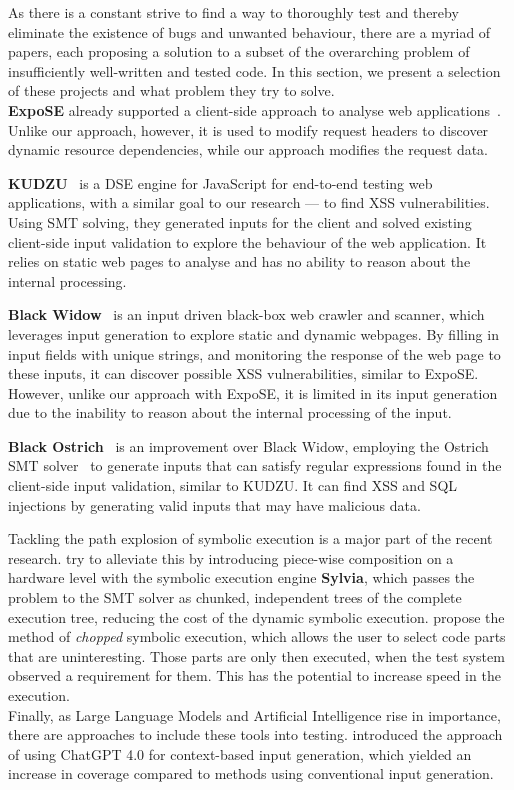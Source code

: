 As there is a constant strive to find a way to thoroughly test and thereby eliminate the existence of bugs and unwanted behaviour, there are a myriad of papers, each proposing a solution to a subset of the overarching problem of insufficiently well-written and tested code. In this section, we present a selection of these projects and what problem they try to solve.\\

\textbf{ExpoSE} already supported a client-side approach to analyse web applications~\cite{loring_practical_2021}. Unlike our approach, however, it is used to modify request headers to discover dynamic resource dependencies, while our approach modifies the request data.

\textbf{KUDZU}~\cite{saxena_symbolic_2010} is a DSE engine for JavaScript for end-to-end testing web applications, with a similar goal to our research — to find XSS vulnerabilities. Using SMT solving, they generated inputs for the client and solved existing client-side input validation to explore the behaviour of the web application. It relies on static web pages to analyse and has no ability to reason about the internal processing.

\textbf{Black Widow}~\cite{eriksson_black_2021} is an input driven black-box web crawler and scanner, which leverages input generation to explore static and dynamic webpages. By filling in input fields with unique strings, and monitoring the response of the web page to these inputs, it can discover possible XSS vulnerabilities, similar to ExpoSE. However, unlike our approach with ExpoSE, it is limited in its input generation due to the inability to reason about the internal processing of the input.  

\textbf{Black Ostrich}~\cite{eriksson_black_2023} is an improvement over Black Widow, employing the Ostrich SMT solver~\cite{chen_ostrich_nodate} to generate inputs that can satisfy regular expressions found in the client-side input validation, similar to KUDZU. It can find XSS and SQL injections by generating valid inputs that may have malicious data. 

Tackling the path explosion of symbolic execution is a  major part of the recent research.
\citet{ryan_sylvia_2023} try to alleviate this by introducing piece-wise composition on a hardware level with the symbolic execution engine \textbf{Sylvia}, which passes the problem to the SMT solver as chunked, independent trees of the complete execution tree, reducing the cost of the dynamic symbolic execution.
\citet{trabish_chopped_2018} propose the method of \textit{chopped} symbolic execution, which allows the user to select code parts that are uninteresting. Those parts are only then executed, when the test system observed a requirement for them. This has the potential to increase speed in the execution.\\


Finally, as Large Language Models and Artificial Intelligence rise in importance, there are approaches to include these tools into testing. \citet{xu_symbolic_2024} introduced the approach of using ChatGPT 4.0 \cite{openai_chatgpt_2025} for context-based input generation, which yielded an increase in coverage compared to methods using conventional input generation.

